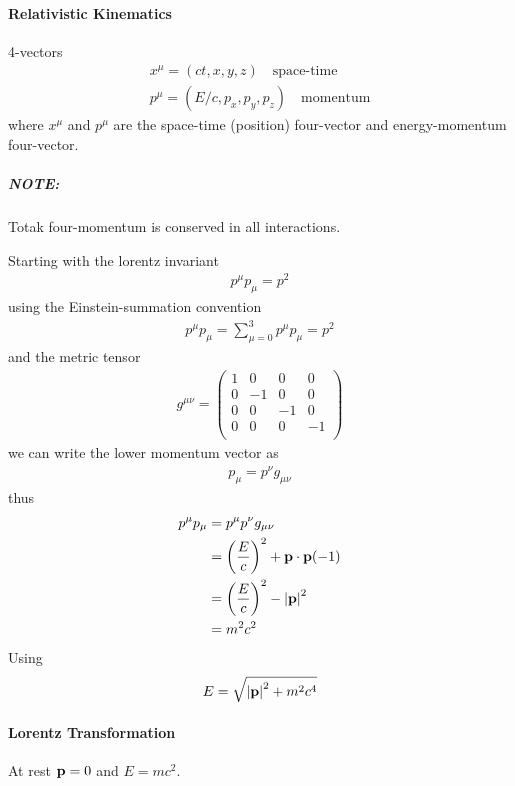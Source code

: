 \documentclass[../main.tex]{subfiles}
\begin{document}
\paragraph{Relativistic Kinematics} 4-vectors
\begin{align*}
    x^\mu = (ct, x, y, z) \quad \textrm{space-time} \\
    p^\mu = (E/c, p_x, p_y, p_z) \quad \textrm{momentum}
\end{align*}
where $x^\mu$ and $p^\mu$ are the space-time (position) four-vector and energy-momentum four-vector.

\subparagraph*{NOTE:} Totak four-momentum is conserved in all interactions.

Starting with the lorentz invariant
\begin{align*}
    p^\mu p_\mu = p^2
\end{align*}
using the Einstein-summation convention
\begin{align*}
    p^\mu p_\mu = \sum_{\mu = 0}^3 p^\mu p_\mu = p^2
\end{align*}
and the metric tensor
\begin{align*}
    g^{\mu\nu} = \begin{pmatrix}
        1 & 0 & 0 & 0 \\
        0 & -1 & 0 & 0 \\
        0 & 0 & -1 & 0 \\
        0 & 0 & 0 & -1 \\
    \end{pmatrix}
\end{align*}
we can write the lower momentum vector as
\begin{align*}
    p_\mu = p^\nu g_{\mu\nu} 
\end{align*}
thus
\begin{align*}
    p^\mu p_\mu &= p^\mu p^\nu g_{\mu\nu} \\
    &= \qt(\frac{E}{c})^2 + \vb{p} \cdot \vb{p} (-1) \\
    &= \qt(\frac{E}{c})^2 - \abs{\vb{p}}^2 \\
    &= m^2 c^2
\end{align*}
Using
\begin{align}
    E = \sqrt{\abs{\vb{p}}^2 + m^2 c^4}
\end{align}

\paragraph{Lorentz Transformation} At rest $\vb{p} = 0$ and $E = mc^2$.
\end{document}
